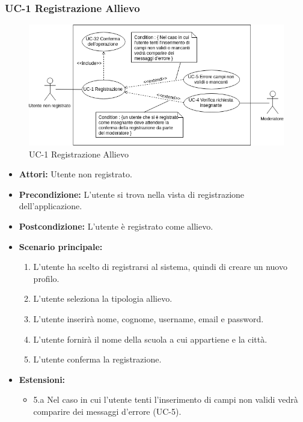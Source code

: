 \subsubsection{UC-1 Registrazione Allievo}
\begin{figure}[h]
	\centering
	\includegraphics[scale=0.7]{images/UC-1.png}
	\caption{UC-1 Registrazione Allievo}
\end{figure}	

\begin{itemize}
		\item \textbf{Attori: }Utente non registrato.
		\item \textbf{Precondizione: }L'utente si trova nella vista di registrazione dell'applicazione.
		\item \textbf{Postcondizione: }L'utente è registrato come allievo.
		\item \textbf{Scenario principale: }
		\begin{enumerate}
		\item L'utente ha scelto di registrarsi al sistema, quindi di creare un nuovo profilo. 
		\item L'utente seleziona la tipologia allievo. 
		\item L'utente inserirà nome, cognome, username, email e password.
		\item L'utente fornirà il nome della scuola a cui appartiene e la città.
		\item L'utente conferma la registrazione.
		\end{enumerate}
		\item \textbf{Estensioni: }
		\begin{itemize}
			\item 5.a Nel caso in cui l'utente tenti l'inserimento di campi non validi vedrà comparire dei messaggi d'errore (UC-5).
		\end{itemize}
\end{itemize}

